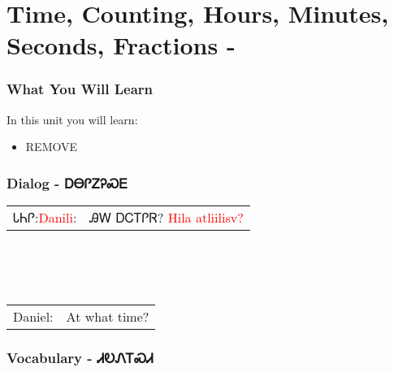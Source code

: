 \index{}
\chapter{Time, Counting, Hours, Minutes, Seconds, Fractions - }
\subsection{What You Will Learn}
In this unit you will learn:
\begin{itemize}
\item REMOVE
\end{itemize}\newpage

\newpage\subsection{Dialog - ᎠᎾᎵᏃᎮᏍᎬ}
\begin{tabular}{p{2cm} p{11cm}}
ᏓᏂᎵ:\newline \textcolor{red}{Danili}: & ᎯᎳ ᎠᏟᎢᎵᏒ? 
\newline\textcolor{red}{Hila atliilisv?}\\
\end{tabular}
\\
\\
\\
\noindent\begin{tabular}{p{2cm} p{11cm}}Daniel: & At what time?\\
\end{tabular}
\vfill\newpage\subsection{Vocabulary - ᏗᎧᏁᎢᏍᏗ 
}

